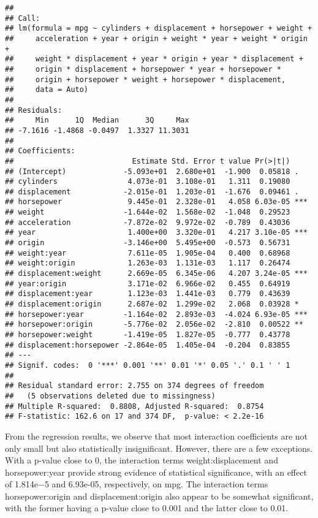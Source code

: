 \documentclass[
]{article}
\begin{document}
\begin{verbatim}
## 
## Call:
## lm(formula = mpg ~ cylinders + displacement + horsepower + weight + 
##     acceleration + year + origin + weight * year + weight * origin + 
##     weight * displacement + year * origin + year * displacement + 
##     origin * displacement + horsepower * year + horsepower * 
##     origin + horsepower * weight + horsepower * displacement, 
##     data = Auto)
## 
## Residuals:
##     Min      1Q  Median      3Q     Max 
## -7.1616 -1.4868 -0.0497  1.3327 11.3031 
## 
## Coefficients:
##                           Estimate Std. Error t value Pr(>|t|)    
## (Intercept)             -5.093e+01  2.680e+01  -1.900  0.05818 .  
## cylinders                4.073e-01  3.108e-01   1.311  0.19080    
## displacement            -2.015e-01  1.203e-01  -1.676  0.09461 .  
## horsepower               9.445e-01  2.328e-01   4.058 6.03e-05 ***
## weight                  -1.644e-02  1.568e-02  -1.048  0.29523    
## acceleration            -7.872e-02  9.972e-02  -0.789  0.43036    
## year                     1.400e+00  3.320e-01   4.217 3.10e-05 ***
## origin                  -3.146e+00  5.495e+00  -0.573  0.56731    
## weight:year              7.611e-05  1.905e-04   0.400  0.68968    
## weight:origin            1.263e-03  1.131e-03   1.117  0.26474    
## displacement:weight      2.669e-05  6.345e-06   4.207 3.24e-05 ***
## year:origin              3.171e-02  6.966e-02   0.455  0.64919    
## displacement:year        1.123e-03  1.441e-03   0.779  0.43639    
## displacement:origin      2.687e-02  1.299e-02   2.068  0.03928 *  
## horsepower:year         -1.164e-02  2.893e-03  -4.024 6.93e-05 ***
## horsepower:origin       -5.776e-02  2.056e-02  -2.810  0.00522 ** 
## horsepower:weight       -1.419e-05  1.827e-05  -0.777  0.43778    
## displacement:horsepower -2.864e-05  1.405e-04  -0.204  0.83855    
## ---
## Signif. codes:  0 '***' 0.001 '**' 0.01 '*' 0.05 '.' 0.1 ' ' 1
## 
## Residual standard error: 2.755 on 374 degrees of freedom
##   (5 observations deleted due to missingness)
## Multiple R-squared:  0.8808, Adjusted R-squared:  0.8754 
## F-statistic: 162.6 on 17 and 374 DF,  p-value: < 2.2e-16
\end{verbatim}

From the regression results, we observe that most interaction
coefficients are not only small but also statistically insignificant.
However, there are a few exceptions. With a p-value close to 0, the
interaction terms weight:displacement and horsepower:year provide strong
evidence of statistical significance, with an effect of 1.814e−5 and
6.93e-05, respectively, on mpg. The interaction terms horsepower:origin
and displacement:origin also appear to be somewhat significant, with the
former having a p-value close to 0.001 and the latter close to 0.01.
\end{document}
